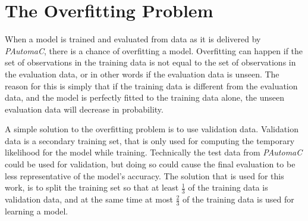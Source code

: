 \section{The Overfitting Problem}
When a model is trained and evaluated from data as it is delivered by \emph{PAutomaC}, there is a chance of overfitting a model. Overfitting can happen if the set of observations in the training data is not equal to the set of observations in the evaluation data, or in other words if the evaluation data is unseen. The reason for this is simply that if the training data is different from the evaluation data, and the model is perfectly fitted to the training data alone, the unseen evaluation data will decrease in probability.

A simple solution to the overfitting problem is to use validation data. Validation data is a secondary training set, that is only used for computing the temporary likelihood for the model while training. Technically the test data from \emph{PAutomaC} could be used for validation, but doing so could cause the final evaluation to be less representative of the model's accuracy. The solution that is used for this work, is to split the training set so that at least $\frac{1}{3}$ of the training data is validation data, and at the same time at most $\frac{2}{3}$ of the training data is used for learning a model.